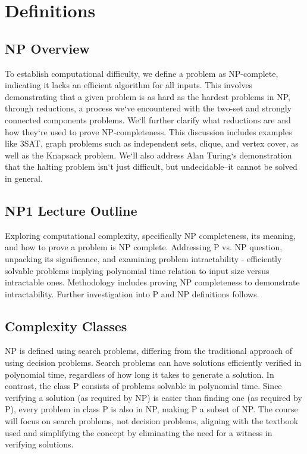 \section*{Definitions}

\subsection*{NP  Overview}
To establish computational difficulty, we define a problem as NP-complete, indicating it lacks an efficient algorithm for all inputs.
This involves demonstrating that a given problem is as hard as the hardest problems in NP, through reductions, a process we`ve encountered with the two-set and strongly connected components problems.
We`ll further clarify what reductions are and how they`re used to prove NP-completeness.
This discussion includes examples like 3SAT, graph problems such as independent sets, clique, and vertex cover, as well as the Knapsack problem.
We`ll also address Alan Turing`s demonstration that the halting problem isn`t just difficult, but undecidable--it cannot be solved in general.

\subsection*{NP1  Lecture Outline}
Exploring computational complexity, specifically NP completeness, its meaning, and how to prove a problem is NP complete.
Addressing P vs.
NP question, unpacking its significance, and examining problem intractability - efficiently solvable problems implying polynomial time relation to input size versus intractable ones.
Methodology includes proving NP completeness to demonstrate intractability.
Further investigation into P and NP definitions follows.

\subsection*{Complexity Classes}
NP is defined using search problems, differing from the traditional approach of using decision problems.
Search problems can have solutions efficiently verified in polynomial time, regardless of how long it takes to generate a solution.
In contrast, the class P consists of problems solvable in polynomial time.
Since verifying a solution (as required by NP) is easier than finding one (as required by P), every problem in class P is also in NP, making P a subset of NP\@.
The course will focus on search problems, not decision problems, aligning with the textbook used and simplifying the concept by eliminating the need for a witness in verifying solutions.

